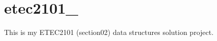 \chapter{etec2101\+\_}
\hypertarget{index}{}\label{index}
\label{index_md__r_e_a_d_m_e}%
%


This is my ETEC2101 (section02) data structures solution project. 